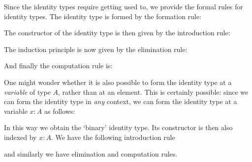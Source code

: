 \begin{rmk}
  Since the identity types require getting used to, we provide the formal rules
  for identity types. The identity type is formed by the formation rule:
  \begin{prooftree}
  \end{prooftree}
  The constructor of the identity type is then given by the introduction rule:
  \begin{prooftree}
  \end{prooftree}
  The induction principle is now given by the elimination rule:
  \begin{prooftree}
  \end{prooftree}
  And finally the computation rule is:
  \begin{prooftree}
  \end{prooftree}
\end{rmk}

\begin{rmk}
  One might wonder whether it is also possible to form the identity type at a \emph{variable} of type $A$, rather than at an element. This is certainly possible: since we can form the identity type in \emph{any} context, we can form the identity type at a variable $x:A$ as follows:
  \begin{prooftree}
  \end{prooftree}
  In this way we obtain the `binary' identity type. Its constructor is then also indexed by $x:A$. We have the following introduction rule
  \begin{prooftree}
  \end{prooftree}
  and similarly we have elimination and computation rules.
\end{rmk}

